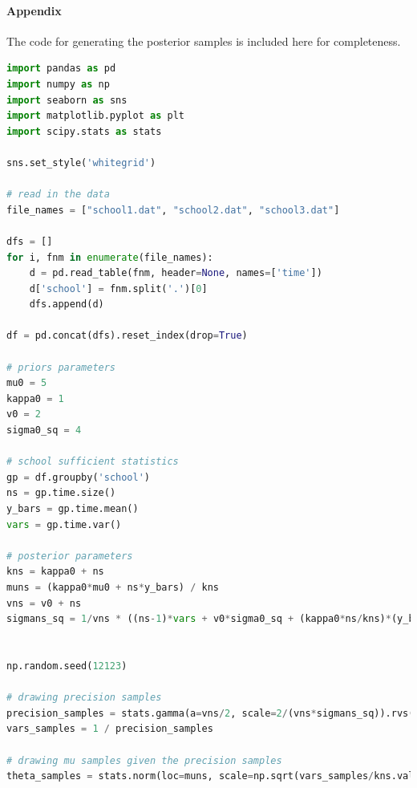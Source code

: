 \documentclass[11pt, letterpaper]{article}
\begin{document}
\paragraph{Appendix}
The code for generating the posterior samples is included here for completeness.
\begin{lstlisting}[language=Python]
import pandas as pd
import numpy as np
import seaborn as sns
import matplotlib.pyplot as plt
import scipy.stats as stats

sns.set_style('whitegrid')

# read in the data
file_names = ["school1.dat", "school2.dat", "school3.dat"]

dfs = []
for i, fnm in enumerate(file_names):
    d = pd.read_table(fnm, header=None, names=['time'])
    d['school'] = fnm.split('.')[0]
    dfs.append(d)

df = pd.concat(dfs).reset_index(drop=True)

# priors parameters
mu0 = 5
kappa0 = 1
v0 = 2
sigma0_sq = 4

# school sufficient statistics
gp = df.groupby('school')
ns = gp.time.size()
y_bars = gp.time.mean()
vars = gp.time.var()

# posterior parameters
kns = kappa0 + ns
muns = (kappa0*mu0 + ns*y_bars) / kns
vns = v0 + ns
sigmans_sq = 1/vns * ((ns-1)*vars + v0*sigma0_sq + (kappa0*ns/kns)*(y_bars-mu0)**2)


np.random.seed(12123)

# drawing precision samples
precision_samples = stats.gamma(a=vns/2, scale=2/(vns*sigmans_sq)).rvs(size=(100000, 3))
vars_samples = 1 / precision_samples

# drawing mu samples given the precision samples
theta_samples = stats.norm(loc=muns, scale=np.sqrt(vars_samples/kns.values)).rvs()
\end{lstlisting}
\end{document}
